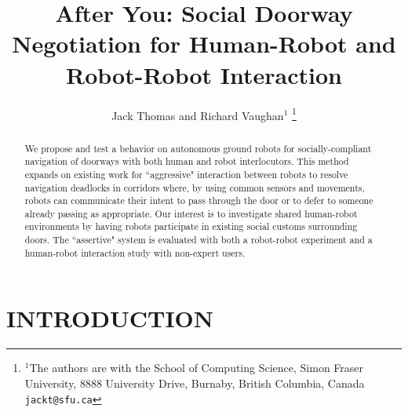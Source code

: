 \documentclass[letterpaper, 10 pt, conference]{ieeeconf}  %
\title{\LARGE \bf
After You: Social Doorway Negotiation for Human-Robot and Robot-Robot Interaction
}
\author{Jack Thomas and Richard Vaughan$^{1}$%
\thanks{$^{1}$The authors are with the School of Computing Science, Simon Fraser University, 8888 University Drive, Burnaby, British Columbia, Canada
        {\tt\small jackt@sfu.ca}}%
}
\begin{document}
\maketitle
\thispagestyle{empty}
\pagestyle{empty}


\begin{abstract}

We propose and test a behavior on autonomous ground robots for socially-compliant navigation of doorways with both human and robot interlocutors. This method expands on existing work for ``aggressive" interaction between robots to resolve navigation deadlocks in corridors where, by using common sensors and movements, robots can communicate their intent to pass through the door or to defer to someone already passing as appropriate. Our interest is to investigate shared human-robot environments by having robots participate in existing social customs surrounding doors. The ``assertive" system is evaluated with both a robot-robot experiment and a human-robot interaction study with non-expert users.

\end{abstract}


\section{INTRODUCTION}


\end{document}
